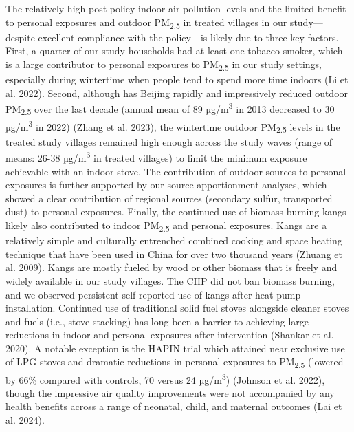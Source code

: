 \documentclass[
  letterpaper,
  DIV=11,
  numbers=noendperiod]{scrartcl}
\begin{document}
The relatively high post-policy indoor air pollution levels and the
limited benefit to personal exposures and outdoor PM\textsubscript{2.5}
in treated villages in our study---despite excellent compliance with the
policy---is likely due to three key factors. First, a quarter of our
study households had at least one tobacco smoker, which is a large
contributor to personal exposures to PM\textsubscript{2.5} in our study
settings, especially during wintertime when people tend to spend more
time indoors (Li et al. 2022). Second, although has Beijing rapidly and
impressively reduced outdoor PM\textsubscript{2.5} over the last decade
(annual mean of 89 µg/m\textsuperscript{3} in 2013 decreased to 30
µg/m\textsuperscript{3} in 2022) (Zhang et al. 2023), the wintertime
outdoor PM\textsubscript{2.5} levels in the treated study villages
remained high enough across the study waves (range of means: 26-38
µg/m\textsuperscript{3} in treated villages) to limit the minimum
exposure achievable with an indoor stove. The contribution of outdoor
sources to personal exposures is further supported by our source
apportionment analyses, which showed a clear contribution of regional
sources (secondary sulfur, transported dust) to personal exposures.
Finally, the continued use of biomass-burning kangs likely also
contributed to indoor PM\textsubscript{2.5} and personal exposures.
Kangs are a relatively simple and culturally entrenched combined cooking
and space heating technique that have been used in China for over two
thousand years (Zhuang et al. 2009). Kangs are mostly fueled by wood or
other biomass that is freely and widely available in our study villages.
The CHP did not ban biomass burning, and we observed persistent
self-reported use of kangs after heat pump installation. Continued use
of traditional solid fuel stoves alongside cleaner stoves and fuels
(i.e., stove stacking) has long been a barrier to achieving large
reductions in indoor and personal exposures after intervention (Shankar
et al. 2020). A notable exception is the HAPIN trial which attained near
exclusive use of LPG stoves and dramatic reductions in personal
exposures to PM\textsubscript{2.5} (lowered by 66\% compared with
controls, 70 versus 24 µg/m\textsuperscript{3}) (Johnson et al. 2022),
though the impressive air quality improvements were not accompanied by
any health benefits across a range of neonatal, child, and maternal
outcomes (Lai et al. 2024).
\end{document}
